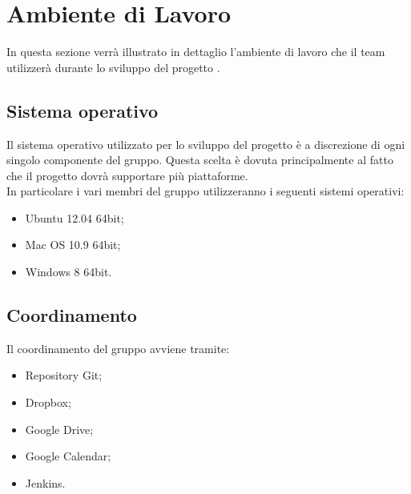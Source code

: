 \section{Ambiente di Lavoro}
\label{ambiente}
In questa sezione verrà illustrato in dettaglio l'ambiente di lavoro che il team \authorName{} utilizzerà durante lo sviluppo del progetto \project.

\subsection{Sistema operativo}
\label{sistema}
Il sistema operativo utilizzato per lo sviluppo del progetto è a discrezione di ogni singolo componente del gruppo. Questa scelta è dovuta principalmente al fatto che il progetto dovrà supportare più piattaforme.
\\In particolare i vari membri del gruppo utilizzeranno i seguenti sistemi operativi:
\begin{itemize}
\item Ubuntu 12.04 64bit;
\item Mac OS\glossario{} 10.9 64bit;
\item Windows\glossario{} 8 64bit.
\end{itemize}

\subsection{Coordinamento}
\label{coordinamento}
Il coordinamento del gruppo avviene tramite:
\begin{itemize}
\item Repository\glossario{} Git\glossario{};
\item Dropbox\glossario{};
\item Google Drive\glossario{};
\item Google Calendar\glossario{};
\item Jenkins.
\end{itemize}

